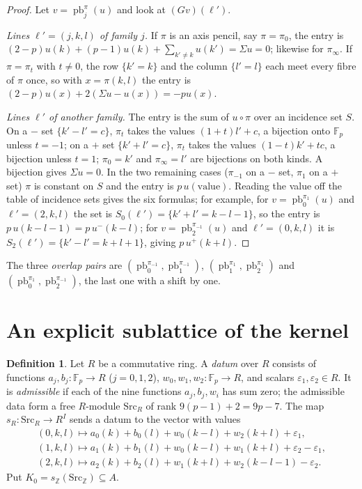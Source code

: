 \documentclass[11pt]{article}
\theoremstyle{definition}
\newtheorem{definition}[theorem]{Definition}
\theoremstyle{remark}
\newcommand{\Z}{\mathbb{Z}}
\newcommand{\F}{\mathbb{F}}
\newcommand{\pb}{\operatorname{pb}}
\newcommand{\SAT}{K_0}
\begin{document}
\begin{proof}
Let $v=\pb_j^\pi(u)$ and look at $(Gv)({\ell'})$.

\emph{Lines ${\ell'}=(j,k,l)$ of family $j$.} If $\pi$ is an axis pencil, say $\pi=\pi_0$, the entry is $(2-p)u(k)+(p-1)u(k)+\sum_{k'\neq k}u(k')=\Sigma u=0$; likewise for $\pi_\infty$. If $\pi=\pi_t$ with $t\neq0$, the row $\{k'=k\}$ and the column $\{l'=l\}$ each meet every fibre of $\pi$ once, so with $x=\pi(k,l)$ the entry is $(2-p)u(x)+2(\Sigma u-u(x))=-pu(x)$.

\emph{Lines ${\ell'}$ of another family.} The entry is the sum of $u\circ\pi$ over an incidence set $S$. On a $-$ set $\{k'-l'=c\}$, $\pi_t$ takes the values $(1+t)l'+c$, a bijection onto $\F_p$ unless $t=-1$; on a $+$ set $\{k'+l'=c\}$, $\pi_t$ takes the values $(1-t)k'+tc$, a bijection unless $t=1$; $\pi_0=k'$ and $\pi_\infty=l'$ are bijections on both kinds. A bijection gives $\Sigma u=0$. In the two remaining cases ($\pi_{-1}$ on a $-$ set, $\pi_1$ on a $+$ set) $\pi$ is constant on $S$ and the entry is $p\,u(\text{value})$. Reading the value off the table of incidence sets gives the six formulas; for example, for $v=\pb_0^{\pi_1}(u)$ and ${\ell'}=(2,k,l)$ the set is $S_0({\ell'})=\{k'+l'=k-l-1\}$, so the entry is $p\,u(k-l-1)=p\,u^-(k-l)$; for $v=\pb_2^{\pi_{-1}}(u)$ and ${\ell'}=(0,k,l)$ it is $S_2({\ell'})=\{k'-l'=k+l+1\}$, giving $p\,u^+(k+l)$.
\end{proof}

The three \emph{overlap pairs} are $(\pb_0^{\pi_{-1}},\pb_1^{\pi_{-1}})$, $(\pb_1^{\pi_1},\pb_2^{\pi_1})$ and $(\pb_0^{\pi_1},\pb_2^{\pi_{-1}})$, the last one with a shift by one.

\section{An explicit sublattice of the kernel}\label{sec:SAT}

\begin{definition}
Let $R$ be a commutative ring. A \emph{datum} over $R$ consists of functions $a_j,b_j:\F_p\to R$ ($j=0,1,2$), $w_0,w_1,w_2:\F_p\to R$, and scalars $\varepsilon_1,\varepsilon_2\in R$. It is \emph{admissible} if each of the nine functions $a_j,b_j,w_i$ has sum zero; the admissible data form a free $R$-module $\mathrm{Src}_R$ of rank $9(p-1)+2=9p-7$. The map $s_R:\mathrm{Src}_R\to R^I$ sends a datum to the vector with values
\[
\begin{array}{ll}
(0,k,l)\mapsto a_0(k)+b_0(l)+w_0(k-l)+w_2(k+l)+\varepsilon_1,\\
(1,k,l)\mapsto a_1(k)+b_1(l)+w_0(k-l)+w_1(k+l)+\varepsilon_2-\varepsilon_1,\\
(2,k,l)\mapsto a_2(k)+b_2(l)+w_1(k+l)+w_2(k-l-1)-\varepsilon_2 .
\end{array}
\]
Put $\SAT=s_\Z(\mathrm{Src}_\Z)\subseteq A$.
\end{definition}
\end{document}
